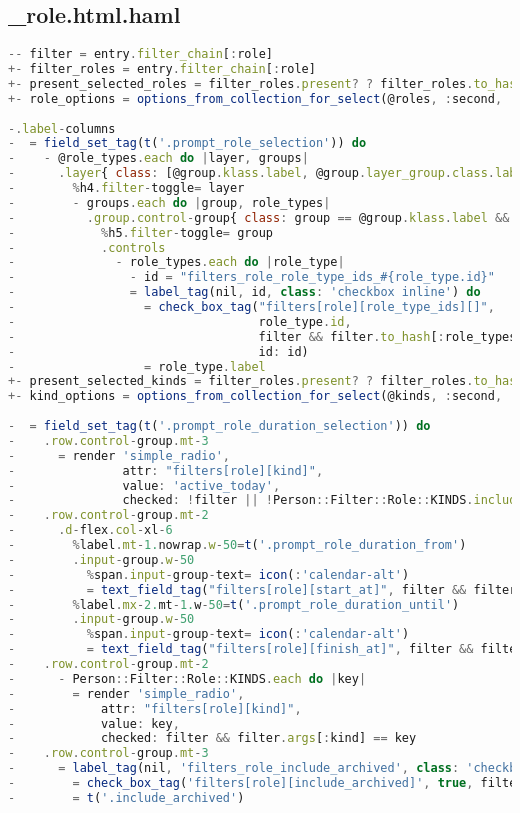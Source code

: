 \subsection{\_role.html.haml}
\begin{lstlisting}[language=JavaScript]
-- filter = entry.filter_chain[:role]
+- filter_roles = entry.filter_chain[:role]
+- present_selected_roles = filter_roles.present? ? filter_roles.to_hash[:role_type_ids] : []
+- role_options = options_from_collection_for_select(@roles, :second, :first, present_selected_roles)
 
-.label-columns
-  = field_set_tag(t('.prompt_role_selection')) do
-    - @role_types.each do |layer, groups|
-      .layer{ class: [@group.klass.label, @group.layer_group.class.label].include?(layer) && 'same-layer' }
-        %h4.filter-toggle= layer
-        - groups.each do |group, role_types|
-          .group.control-group{ class: group == @group.klass.label && 'same-group' }
-            %h5.filter-toggle= group
-            .controls
-              - role_types.each do |role_type|
-                - id = "filters_role_role_type_ids_#{role_type.id}"
-                = label_tag(nil, id, class: 'checkbox inline') do
-                  = check_box_tag("filters[role][role_type_ids][]",
-                                  role_type.id,
-                                  filter && filter.to_hash[:role_types].include?(role_type.to_s),
-                                  id: id)
-                  = role_type.label
+- present_selected_kinds = filter_roles.present? ? filter_roles.to_hash[:kind] : []
+- kind_options = options_from_collection_for_select(@kinds, :second, :first, present_selected_kinds)
 
-  = field_set_tag(t('.prompt_role_duration_selection')) do
-    .row.control-group.mt-3
-      = render 'simple_radio',
-               attr: "filters[role][kind]",
-               value: 'active_today',
-               checked: !filter || !Person::Filter::Role::KINDS.include?(filter.args[:kind])
-    .row.control-group.mt-2
-      .d-flex.col-xl-6
-        %label.mt-1.nowrap.w-50=t('.prompt_role_duration_from')
-        .input-group.w-50
-          %span.input-group-text= icon(:'calendar-alt')
-          = text_field_tag("filters[role][start_at]", filter && filter.args[:start_at], class: 'date col-2 form-control form-control-sm')
-        %label.mx-2.mt-1.w-50=t('.prompt_role_duration_until')
-        .input-group.w-50
-          %span.input-group-text= icon(:'calendar-alt')
-          = text_field_tag("filters[role][finish_at]", filter && filter.args[:finish_at], class: 'date col-2 form-control form-control-sm')
-    .row.control-group.mt-2
-      - Person::Filter::Role::KINDS.each do |key|
-        = render 'simple_radio',
-            attr: "filters[role][kind]",
-            value: key,
-            checked: filter && filter.args[:kind] == key
-    .row.control-group.mt-3
-      = label_tag(nil, 'filters_role_include_archived', class: 'checkbox inline mt-2') do
-        = check_box_tag('filters[role][include_archived]', true, filter && true?(filter.args[:include_archived]))
-        = t('.include_archived')

\end{lstlisting}

